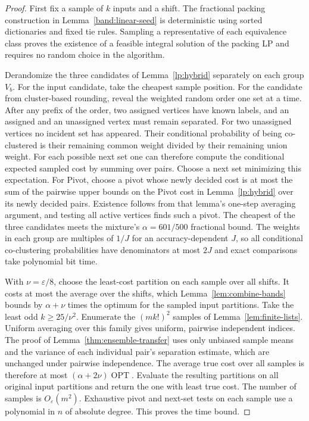 \documentclass[11pt]{article}
\begin{document}
\begin{proof}
First fix a sample of $k$ inputs and a shift. The fractional packing
construction in Lemma~\ref{band:linear-seed} is deterministic using
sorted dictionaries and fixed tie rules. Sampling a representative
of each equivalence class proves the existence of a feasible integral solution of the
packing LP and requires no random choice in the algorithm.

Derandomize the three candidates of Lemma~\ref{lp:hybrid} separately
on each group $V_b$. For the input candidate, take the cheapest sample position.
For the candidate from cluster-based rounding, reveal the weighted random order one set at
a time. After any prefix of the order, two assigned vertices have
known labels, and an assigned and an unassigned vertex must remain
separated. For two unassigned vertices no incident set has appeared.
Their conditional probability of being co-clustered is their remaining
common weight divided by their remaining union weight. For each
possible next set one can therefore compute the conditional expected
sampled cost by summing over pairs. Choose a next set minimizing this
expectation. For Pivot, choose a pivot whose newly decided cost is
at most the sum of the pairwise upper bounds on the Pivot cost in
Lemma~\ref{lp:hybrid} over its newly decided pairs. Existence follows
from that lemma's one-step averaging argument, and testing all active
vertices finds such a pivot. The cheapest of the three candidates meets
the mixture's $\alpha=601/500$ fractional bound. The weights in each
group are multiples of $1/J$ for an accuracy-dependent $J$, so all
conditional co-clustering probabilities have denominators at most $2J$ and
exact comparisons take polynomial bit time.

With $\nu=\varepsilon/8$, choose the least-cost partition on each
sample over all shifts. It costs at most the average over the shifts,
which Lemma~\ref{lem:combine-bands} bounds by $\alpha+\nu$ times the
optimum for the sampled input partitions. Take the least odd $k\ge25/\nu^2$. Enumerate
the $(m k!)^2$ samples of Lemma~\ref{lem:finite-lists}. Uniform averaging
over this family gives uniform, pairwise independent indices. The
proof of Lemma~\ref{thm:ensemble-transfer} uses only unbiased sample
means and the variance of each individual pair's separation estimate,
which are unchanged under pairwise independence. The average true cost
over all samples is therefore at most $(\alpha+2\nu)\operatorname{OPT}$.
Evaluate the resulting partitions on all original input partitions and return the
one with least true cost. The number of samples is $O_\varepsilon(m^2)$. Exhaustive pivot
and next-set tests on each sample
use a polynomial in $n$ of absolute degree. This proves the time bound.
\end{proof}
\end{document}
